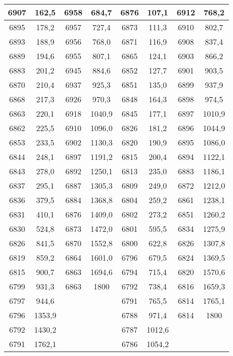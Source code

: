 \documentclass[11pt]{article}
\begin{document}
{{\begin{tabular}{|c|c|c|c|c|c|c|c|}
            \hline 
            6907 & 162,5 & 6958 & 684,7 & 6876 & 107,1 & 6912 & 768,2\tabularnewline
            \hline 
            6895 & 178,2 & 6957 & 727,4 & 6873 & 111,3 & 6910 & 802,7\tabularnewline
            \hline 
            6893 & 188,9 & 6956 & 768,0 & 6871 & 116,9 & 6908 & 837,4\tabularnewline
            \hline 
            6889 & 194,6 & 6955 & 807,1 & 6865 & 124,1 & 6903 & 866,2\tabularnewline
            \hline 
            6883 & 201,2 & 6945 & 884,6 & 6852 & 127,7 & 6901 & 903,5\tabularnewline
            \hline 
            6870 & 210,4 & 6937 & 925,3 & 6851 & 135,0 & 6899 & 937,9\tabularnewline
            \hline 
            6868 & 217,3 & 6926 & 970,3 & 6848 & 164,3 & 6898 & 974,5\tabularnewline
            \hline 
            6863 & 220,1 & 6918 & 1040,9 & 6845 & 177,1 & 6897 & 1010,9\tabularnewline
            \hline 
            6862 & 225,5 & 6910 & 1096,0 & 6826 & 181,2 & 6896 & 1044,9\tabularnewline
            \hline 
            6853 & 233,5 & 6902 & 1130,3 & 6820 & 190,9 & 6895 & 1086,0\tabularnewline
            \hline 
            6844 & 248,1 & 6897 & 1191,2 & 6815 & 200,4 & 6894 & 1122,1\tabularnewline
            \hline 
            6843 & 278,0 & 6892 & 1250,1 & 6813 & 235,0 & 6883 & 1186,1\tabularnewline
            \hline 
            6837 & 295,1 & 6887 & 1305,3 & 6809 & 249,0 & 6872 & 1212,0\tabularnewline
            \hline 
            6836 & 379,5 & 6884 & 1368,8 & 6804 & 259,2 & 6861 & 1238,1\tabularnewline
            \hline 
            6831 & 410,1 & 6876 & 1409,0 & 6802 & 273,2 & 6851 & 1260,2\tabularnewline
            \hline 
            6830 & 524,8 & 6873 & 1472,0 & 6801 & 595,5 & 6834 & 1275,9\tabularnewline
            \hline 
            6826 & 841,5 & 6870 & 1552,8 & 6800 & 622,8 & 6826 & 1307,8\tabularnewline
            \hline 
            6819 & 859,2 & 6864 & 1601,0 & 6796 & 679,5 & 6824 & 1369,5\tabularnewline
            \hline 
            6815 & 900,7 & 6863 & 1694,6 & 6794 & 715,4 & 6820 & 1570,6\tabularnewline
            \hline 
            6799 & 931,3 & 6863 & 1800 & 6792 & 738,4 & 6816 & 1659,3\tabularnewline
            \hline 
            6797 & 944,6 & \multicolumn{1}{c}{} &  & 6791 & 765,5 & 6814 & 1765,1\tabularnewline
            \cline{1-2} \cline{5-8} 
            6796 & 1353,9 & \multicolumn{1}{c}{} &  & 6788 & 971,4 & 6814 & 1800\tabularnewline
            \cline{1-2} \cline{5-8} 
            6792 & 1430,2 & \multicolumn{1}{c}{} &  & 6787 & 1012,6 & \multicolumn{1}{c}{} & \multicolumn{1}{c}{}\tabularnewline
            \cline{1-2} \cline{5-6} 
            6791 & 1762,1 & \multicolumn{1}{c}{} &  & 6786 & 1054,2 & \multicolumn{1}{c}{} & \multicolumn{1}{c}{}\tabularnewline

\end{tabular}}}
\end{document}
